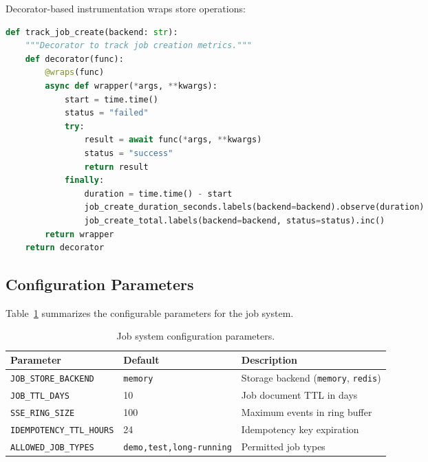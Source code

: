 Decorator-based instrumentation wraps store operations:

\begin{lstlisting}[language=Python, caption={Metrics tracking decorator.}]
def track_job_create(backend: str):
    """Decorator to track job creation metrics."""
    def decorator(func):
        @wraps(func)
        async def wrapper(*args, **kwargs):
            start = time.time()
            status = "failed"
            try:
                result = await func(*args, **kwargs)
                status = "success"
                return result
            finally:
                duration = time.time() - start
                job_create_duration_seconds.labels(backend=backend).observe(duration)
                job_create_total.labels(backend=backend, status=status).inc()
        return wrapper
    return decorator
\end{lstlisting}

\subsection{Configuration Parameters}

Table~\ref{tab:job-config} summarizes the configurable parameters for the job system.

\begin{table}[ht]
\centering
\caption{Job system configuration parameters.}
\label{tab:job-config}
\small
\begin{tabular}{lll}
\hline
\textbf{Parameter} & \textbf{Default} & \textbf{Description} \\
\hline
\texttt{JOB\_STORE\_BACKEND} & \texttt{memory} & Storage backend (\texttt{memory}, \texttt{redis}) \\
\texttt{JOB\_TTL\_DAYS} & 10 & Job document TTL in days \\
\texttt{SSE\_RING\_SIZE} & 100 & Maximum events in ring buffer \\
\texttt{IDEMPOTENCY\_TTL\_HOURS} & 24 & Idempotency key expiration \\
\texttt{ALLOWED\_JOB\_TYPES} & \texttt{demo,test,long-running} & Permitted job types \\
\hline
\end{tabular}
\end{table}

